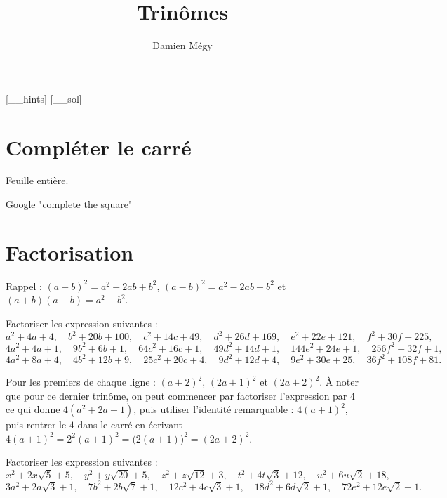 




[_\jobname_hints]
[_\jobname_sol]


\title{Trinômes}
\author{Damien Mégy}
\maketitle


\section{Compléter le carré}

Feuille entière.

Google "complete the square" 

\section{Factorisation}


Rappel :  $(a+b)^2=a^2+2ab+b^2$, $(a-b)^2=a^2-2ab+b^2$ et $(a+b)(a-b)=a^2-b^2$.

\begin{exo}
Factoriser les expression suivantes : 
\[ a^2+4a+4, \quad
b^2+20b+100,\quad
c^2+14c+49,\quad
d^2+26d+169,\quad
e^2+22e+121,\quad
f^2+30f+225,
\]
\[ 
4a^2+4a+1,\quad
9b^2+6b+1,\quad
64c^2+16c+1,\quad
49d^2+14d+1,\quad
144e^2+24e+1,\quad
256f^2+32f+1,
\]
\[
4a^2+8a+4,\quad
4b^2+12b+9,\quad
25c^2+20c+4,\quad
9d^2+12d+4,\quad
9e^2+30e+25,\quad
36f^2+108f+81.
\]
\begin{hint}
Pour les premiers de chaque ligne : $(a+2)^2$, $(2a+1)^2$ et $(2a+2)^2$. À noter que pour ce dernier trinôme, on peut commencer par factoriser l'expression par $4$ ce qui donne $4(a^2+2a+1)$, puis utiliser l'identité remarquable : $4(a+1)^2$, puis \og rentrer\fg{} le $4$ dans le carré en écrivant $4(a+1)^2 = 2^2(a+1)^2 = \big(2(a+1)\big)^2 = (2a+2)^2$.
\end{hint}
\end{exo}

\begin{exo}
Factoriser les expression suivantes : 
\[ 
x^2+2x\sqrt{5}+5,\quad
y^2+y\sqrt{20}+5,\quad
z^2+z\sqrt{12}+3,\quad
t^2+4t\sqrt{3}+12,\quad
u^2+6u\sqrt{2}+18,
\]
\[
3a^2+2a\sqrt{3}+1,\quad
7b^2+2b\sqrt{7}+1,\quad
12c^2+4c\sqrt{3}+1,\quad
18d^2+6d\sqrt{2}+1,\quad
72e^2+12e\sqrt{2}+1.
\]
\end{exo}


